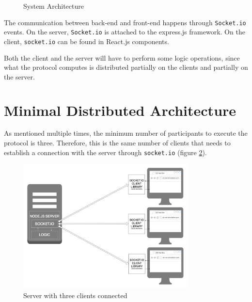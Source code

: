 \begin{figure}[H]
    \centering
    \caption{System Architecture}
    \label{fig:systemArchitecture}
\end{figure}

The communication between back-end and front-end happens through \lstinline{Socket.io} events. On the server, \lstinline{Socket.io} is attached to the express.js framework. On the client, \lstinline{socket.io} can be found in React.js components.

Both the client and the server will have to perform some logic operations, since what the protocol computes is distributed partially on the clients and partially on the server.

\section{Minimal Distributed Architecture}

As mentioned multiple times, the minimum number of participants to execute the protocol is three. Therefore, this is the same number of clients that needs to establish a connection with the server through \lstinline{socket.io} (figure \ref{fig:distrubtedArchitecture}).

\begin{figure}[H]
    \centering
    \includegraphics[width=0.8\textwidth]{Images/Design/distributedArchitecture.png}
    \caption{Server with three clients connected}
    \label{fig:distrubtedArchitecture}
\end{figure}

